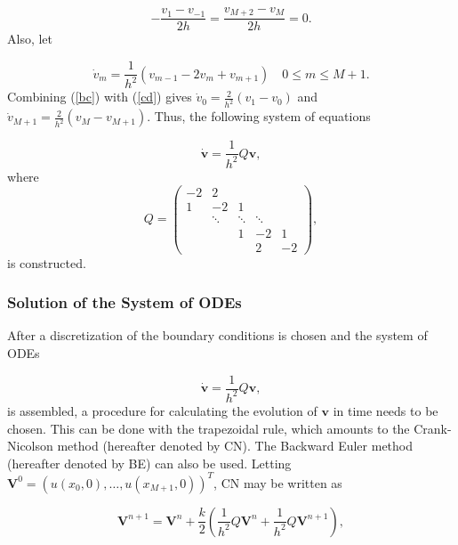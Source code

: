 \begin{equation}
    -\frac{v_1 -v_{-1}}{2h} = \frac{v_{M+2} - v_M}{2h} = 0.
\label{bc}
\end{equation}
Also, let

\begin{equation}
    \dot{v}_m = \frac{1}{h^2}(v_{m-1} - 2v_m + v_{m+1}) \quad 0 \le m \le M + 1.
\label{cd}
\end{equation}
Combining (\ref{bc}) with (\ref{cd}) gives $\dot{v}_0 = \frac{2}{h^2}(v_{1} - v_{0})$ and $\dot{v}_{M+1} = \frac{2}{h^2}(v_{M} - v_{M+1})$. Thus, the following system of equations

\begin{equation*}
    \dot{\boldsymbol{v}} = \frac{1}{h^2}Q\boldsymbol{v},
\end{equation*}
where 
\begin{equation*}
Q = \begin{pmatrix}
    -2 & 2 & & & \\
    1 & -2 & 1 & & \\
    & \ddots & \ddots & \ddots &\\
     & & 1 & -2 & 1 \\
     &  & & 2 & -2
    \end{pmatrix}, 
\end{equation*}
is constructed.

\subsubsection{Solution of the System of ODEs}
After a discretization of the boundary conditions is chosen and the system of ODEs

\begin{equation*}
    \dot{\boldsymbol{v}} = \frac{1}{h^2}Q\boldsymbol{v},
\end{equation*}
is assembled, a procedure for calculating the evolution of $\boldsymbol{v}$ in time needs to be chosen. This can be done with the trapezoidal rule, which amounts to the Crank-Nicolson method (hereafter denoted by CN). The Backward Euler method (hereafter denoted by BE) can also be used. Letting  $\boldsymbol{V}^0 = (u(x_0,0), \dots, u(x_{M+1},0))^T$, CN may be written as

\begin{equation*}
    \boldsymbol{V}^{n+1} = \boldsymbol{V}^n + \frac{k}{2}\left(\frac{1}{h^2}Q\boldsymbol{V}^n + \frac{1}{h^2}Q\boldsymbol{V}^{n+1} \right), 
\end{equation*}


